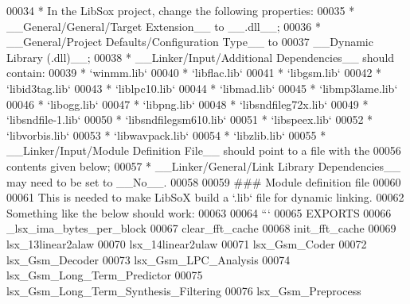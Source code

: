 \begin{DoxyCode}
00034 \textcolor{stringliteral}{* In the LibSox project, change the following properties:}
00035 \textcolor{stringliteral}{  * \_\_General/General/Target Extension\_\_ to \_\_.dll\_\_;}
00036 \textcolor{stringliteral}{  * \_\_General/Project Defaults/Configuration Type\_\_ to}
00037 \textcolor{stringliteral}{    \_\_Dynamic Library (.dll)\_\_;}
00038 \textcolor{stringliteral}{  * \_\_Linker/Input/Additional Dependencies\_\_ should contain:}
00039 \textcolor{stringliteral}{    * `winmm.lib`}
00040 \textcolor{stringliteral}{    * `libflac.lib`}
00041 \textcolor{stringliteral}{    * `libgsm.lib`}
00042 \textcolor{stringliteral}{    * `libid3tag.lib`}
00043 \textcolor{stringliteral}{    * `liblpc10.lib`}
00044 \textcolor{stringliteral}{    * `libmad.lib`}
00045 \textcolor{stringliteral}{    * `libmp3lame.lib`}
00046 \textcolor{stringliteral}{    * `libogg.lib`}
00047 \textcolor{stringliteral}{    * `libpng.lib`}
00048 \textcolor{stringliteral}{    * `libsndfileg72x.lib`}
00049 \textcolor{stringliteral}{    * `libsndfile-1.lib`}
00050 \textcolor{stringliteral}{    * `libsndfilegsm610.lib`}
00051 \textcolor{stringliteral}{    * `libspeex.lib`}
00052 \textcolor{stringliteral}{    * `libvorbis.lib`}
00053 \textcolor{stringliteral}{    * `libwavpack.lib`}
00054 \textcolor{stringliteral}{    * `libzlib.lib`}
00055 \textcolor{stringliteral}{  * \_\_Linker/Input/Module Definition File\_\_ should point to a file with the}
00056 \textcolor{stringliteral}{    contents given below;}
00057 \textcolor{stringliteral}{  * \_\_Linker/General/Link Library Dependencies\_\_ may need to be set to \_\_No\_\_.}
00058 \textcolor{stringliteral}{}
00059 \textcolor{stringliteral}{### Module definition file}
00060 \textcolor{stringliteral}{}
00061 \textcolor{stringliteral}{This is needed to make LibSoX build a `.lib` file for dynamic linking.}
00062 \textcolor{stringliteral}{Something like the below should work:}
00063 \textcolor{stringliteral}{}
00064 \textcolor{stringliteral}{```}
00065 \textcolor{stringliteral}{EXPORTS}
00066 \textcolor{stringliteral}{\_lsx\_ima\_bytes\_per\_block}
00067 \textcolor{stringliteral}{clear\_fft\_cache}
00068 \textcolor{stringliteral}{init\_fft\_cache}
00069 \textcolor{stringliteral}{lsx\_13linear2alaw}
00070 \textcolor{stringliteral}{lsx\_14linear2ulaw}
00071 \textcolor{stringliteral}{lsx\_Gsm\_Coder}
00072 \textcolor{stringliteral}{lsx\_Gsm\_Decoder}
00073 \textcolor{stringliteral}{lsx\_Gsm\_LPC\_Analysis}
00074 \textcolor{stringliteral}{lsx\_Gsm\_Long\_Term\_Predictor}
00075 \textcolor{stringliteral}{lsx\_Gsm\_Long\_Term\_Synthesis\_Filtering}
00076 \textcolor{stringliteral}{lsx\_Gsm\_Preprocess}

\end{DoxyCode}
